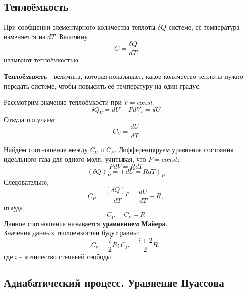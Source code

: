 \documentclass[a4paper,12pt]{article}
\begin{document}
\subsection{Теплоёмкость}
При сообщении элементарного количества теплоты $\delta Q$ системе, её температура изменяется на $dT$. Величину\\
$$C = \frac{\delta Q}{dT}$$
называют теплоёмкостью.

\textbf{Теплоёмкость} - величина, которая показывает, какое количество теплоты нужно передать системе, чтобы повысить её температуру на один градус.

Рассмотрим значение теплоёмкости при $V = const$:
$$\delta Q_V = dU + PdV_V = dU$$
Откуда получаем:
\begin{equation}
C_V = \frac{dU}{dT}
\end{equation}

Найдём соотношение между $C_V$ и $C_P$.
Дифференцируем уравнение состояния идеального газа для одного моля, учитывая, что $P = const$:
$$PdV = RdT$$
$$(\delta Q)_P = (dU = RdT)_P$$
Следовательно,
$$C_P = \frac{(\delta Q)_P}{dT} = \frac{dU}{dT} + R,$$
откуда
\begin{equation}\label{mayer}
C_P = C_V + R
\end{equation}
Данное соотношение называется \textbf{уравнением Майера}.\\

Значения данных теплоёмкостей будут равны:
\begin{equation}
C_V = \frac{i}{2}R; C_P = \frac{i+2}{2}R,
\end{equation}
где $i$ - количество степеней свободы.

\subsection{Адиабатический процесс. Уравнение Пуассона}
\end{document}
